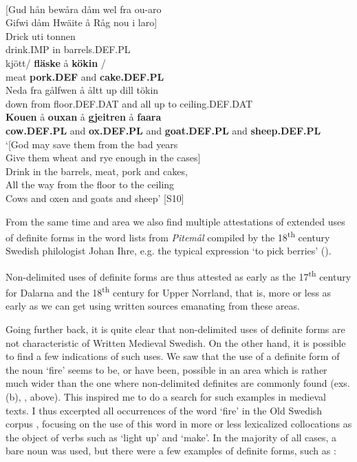\ea \label{} 
\\
{}[Gud hån bewåra dåm wel fra ou-aro\\
Gifwi dåm Hwäite å Råg nou i laro]\\
\gll Drick  uti  tonnen\\
drink.IMP  in  barrels.DEF.PL\\
\gll kjött/  \textbf{fläske}  å  \textbf{kökin}  /\\
meat  \textbf{pork.DEF} and  \textbf{cake.DEF.PL} \\
\gll Neda  fra  gålfwen  å  åltt  up  dill  tökin\\
down  from  floor.DEF.DAT  and  all  up  to  ceiling.DEF.DAT\\
\gll \textbf{Kouen} å  \textbf{ouxan} å  \textbf{gjeitren} å  \textbf{faara} \\
\textbf{cow.DEF.PL} and  \textbf{ox.DEF.PL} and  \textbf{goat.DEF.PL} and  \textbf{sheep.DEF.PL} \\
\glt ‘[God may save them from the bad years\\
Give them wheat and rye enough in the cases]\\
Drink in the barrels, meat, pork and cakes,\\
All the way from the floor to the ceiling\\
Cows and oxen and goats and sheep’ [S10]

\z

From the same time and area we also find multiple attestations of extended uses of definite forms in the word lists from \textit{Pitemål} compiled by the 18\textsuperscript{th} century Swedish philologist Johan Ihre, e.g. the typical expression ‘to pick berries’ (\citet{Reinhammar2002}).

Non-delimited uses of definite forms are thus attested as early as the 17\textsuperscript{th} century for Dalarna and the 18\textsuperscript{th} century for Upper Norrland, that is, more or less as early as we can get using written sources emanating from these areas. 

Going further back, it is quite clear that non-delimited uses of definite forms are not characteristic of Written Medieval Swedish. On the other hand, it is possible to find a few indications of such uses. We saw that the use of a definite form of the noun  ‘fire’ seems to be, or have been, possible in an area which is rather much wider than the one where non-delimited definites are commonly found (exs. (b), ,  above). This inspired me to do a search for such examples in medieval texts. I thus excerpted all occurrences of the word  ‘fire’ in the Old Swedish corpus , focusing on the use of this word in more or less lexicalized collocations as the object of verbs such as  ‘light up’ and  ‘make’. In the majority of all cases, a bare noun was used, but there were a few examples of definite forms, such as :

